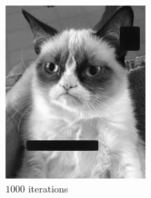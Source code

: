 \documentclass{paper}
\begin{document}
\begin{figure}[ht]
\vspace{3mm}
\begin{subfigure}[ht]{0.3\textwidth}
	\centering
	\includegraphics[width=\textwidth]{cat-iter1000-lambda1000-alpha0_0005}
	\caption*{$1000$ iterations}
\end{subfigure}
~
\begin{subfigure}[ht]{0.3\textwidth}
	\centering

\end{subfigure}
\end{figure}
\end{document}
